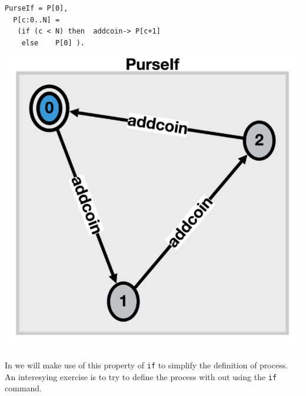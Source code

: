 \documentclass[]{article}
\begin{document}
\begin{center}\begin{minipage}{0.5\textwidth}
\begin{verbatim}
PurseIf = P[0],
  P[c:0..N] =
   (if (c < N) then  addcoin-> P[c+1]
    else    P[0] ).\end{verbatim}
\end{minipage}
\begin{minipage}{0.3\textwidth}
\includegraphics[scale=0.15]{PurseIf.jpg}
\end{minipage}\end{center}





In  we will make use of this property of \verb|if| to simplify the definition of process. An interesying exercise is to try to define the process with out using the \verb|if| command.
\end{document}
